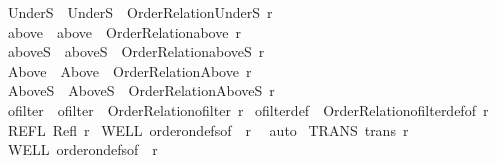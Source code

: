 \begin{isabellebody}
\ UnderS\ \ {\isachardoublequoteopen}UnderS\ {\isasymequiv}\ Order{\isacharunderscore}{\kern0pt}Relation{\isachardot}{\kern0pt}UnderS\ r{\isachardoublequoteclose}\isanewline
{}\isamarkupfalse%
\ above\ \ {\isachardoublequoteopen}above\ {\isasymequiv}\ Order{\isacharunderscore}{\kern0pt}Relation{\isachardot}{\kern0pt}above\ r{\isachardoublequoteclose}\isanewline
{}\isamarkupfalse%
\ aboveS\ \ {\isachardoublequoteopen}aboveS\ {\isasymequiv}\ Order{\isacharunderscore}{\kern0pt}Relation{\isachardot}{\kern0pt}aboveS\ r{\isachardoublequoteclose}\isanewline
{}\isamarkupfalse%
\ Above\ \ {\isachardoublequoteopen}Above\ {\isasymequiv}\ Order{\isacharunderscore}{\kern0pt}Relation{\isachardot}{\kern0pt}Above\ r{\isachardoublequoteclose}\isanewline
{}\isamarkupfalse%
\ AboveS\ \ {\isachardoublequoteopen}AboveS\ {\isasymequiv}\ Order{\isacharunderscore}{\kern0pt}Relation{\isachardot}{\kern0pt}AboveS\ r{\isachardoublequoteclose}\isanewline
{}\isamarkupfalse%
\ ofilter\ \ {\isachardoublequoteopen}ofilter\ {\isasymequiv}\ Order{\isacharunderscore}{\kern0pt}Relation{\isachardot}{\kern0pt}ofilter\ r{\isachardoublequoteclose}\isanewline
{}\isamarkupfalse%
\ ofilter{\isacharunderscore}{\kern0pt}def\ {\isacharequal}{\kern0pt}\ Order{\isacharunderscore}{\kern0pt}Relation{\isachardot}{\kern0pt}ofilter{\isacharunderscore}{\kern0pt}def{\isacharbrackleft}{\kern0pt}of\ r{\isacharbrackright}{\kern0pt}%
\isadelimdocument
%
\endisadelimdocument
%
\isatagdocument
%
\isamarkuptrue%
%
\endisatagdocument
{\isafolddocument}%
%
\isadelimdocument
%
\endisadelimdocument
{}\isamarkupfalse%
\ REFL{\isacharcolon}{\kern0pt}\ {\isachardoublequoteopen}Refl\ r{\isachardoublequoteclose}\isanewline
%
\isadelimproof
%
\endisadelimproof
%
\isatagproof
{}\isamarkupfalse%
\ WELL\ order{\isacharunderscore}{\kern0pt}on{\isacharunderscore}{\kern0pt}defs{\isacharbrackleft}{\kern0pt}of\ {\isacharunderscore}{\kern0pt}\ r{\isacharbrackright}{\kern0pt}\ \isamarkupfalse%
\ auto%
\endisatagproof
{\isafoldproof}%
%
\isadelimproof
\isanewline
%
\endisadelimproof
\isanewline
{}\isamarkupfalse%
\ TRANS{\isacharcolon}{\kern0pt}\ {\isachardoublequoteopen}trans\ r{\isachardoublequoteclose}\isanewline
%
\isadelimproof
%
\endisadelimproof
%
\isatagproof
{}\isamarkupfalse%
\ WELL\ order{\isacharunderscore}{\kern0pt}on{\isacharunderscore}{\kern0pt}defs{\isacharbrackleft}{\kern0pt}of\ {\isacharunderscore}{\kern0pt}\ r{\isacharbrackright}{\kern0pt}\ \isamarkupfalse%

\end{isabellebody}
